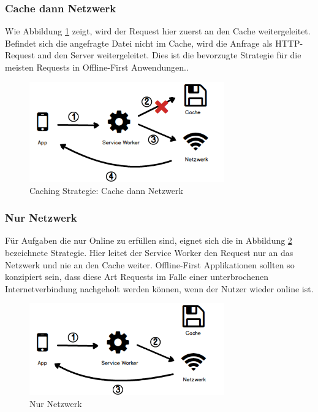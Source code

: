 \documentclass[a4paper, 12pt]{scrreprt}
\begin{document}
\subsubsection{Cache dann Netzwerk}
Wie Abbildung \ref{fig:cachingCacheFirst} zeigt, wird der Request hier zuerst an den Cache weitergeleitet. Befindet sich die angefragte Datei nicht im Cache, wird die Anfrage als \ac{HTTP}-Request and den Server weitergeleitet. Dies ist die bevorzugte Strategie für die meisten Requests in Offline-First Anwendungen.\autocite[Kapitel 05]{BookBuildingPWAs}.

\begin{figure}[h]
	\centering
	\includegraphics[width=0.75\textwidth]{cachefirst.png}
	\caption{Caching Strategie: Cache dann Netzwerk}
	\label{fig:cachingCacheFirst}
\end{figure}

\subsubsection{Nur Netzwerk}
Für Aufgaben die nur Online zu erfüllen sind, eignet sich die in Abbildung \ref{fig:cachingNetworkOnly} bezeichnete Strategie. Hier leitet der Service Worker den Request nur an das Netzwerk und nie an den Cache weiter. Offline-First Applikationen sollten so konzipiert sein, dass diese Art Requests im Falle einer unterbrochenen Internetverbindung nachgeholt werden können, wenn der Nutzer wieder online ist.

\begin{figure}[h]
	\centering
	\includegraphics[width=0.75\textwidth]{networkonly.png}
	\caption{Nur Netzwerk}
	\label{fig:cachingNetworkOnly}
\end{figure}
\end{document}
